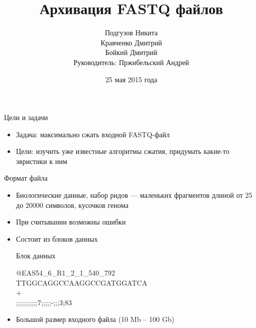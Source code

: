 \documentclass[12pt]{beamer}
\begin{document}
\title{Архивация FASTQ файлов}

\author[]{
    Подгузов Никита \\
    Кравченко Дмитрий \\
    Бойкий Дмитрий \\ 
    \vspace{\baselineskip}
    \footnotesize Руководитель: Пржибельский Андрей 
}
\date{25 мая 2015 года}

\frame{\titlepage}

\begin{frame}{Цели и задачи}

    \begin{itemize}

        \item <1-> Задача: максимально сжать входной FASTQ-файл
        
        \item <2-> Цели: изучить уже известные алгоритмы сжатия, придумать какие-то эвристики к ним

        \end{itemize}

\end{frame}

\begin{frame}{Формат файла}

    \begin{itemize}

        \item <1-> Биологические данные, набор ридов --- маленьких фрагментов длиной от 25 до 20000 символов, кусочков генома

        \item <2-> При считывании возможны ошибки

	    \item <3-> Состоит из блоков данных

        \begin{block}{Блок данных}
    
            @EAS54{\_}6{\_}R1{\_}2{\_}1{\_}540{\_}792\\
            TTGGCAGGCCAAGGCCGATGGATCA\\
            + \\
            ;;;;;;;;;;;7;;;;;-;;;3;83 

        \end{block}
    
        \item <4-> Большой размер входного файла (10 Mb -- 100 Gb)

    \end{itemize}

\end{frame}
\end{document}
